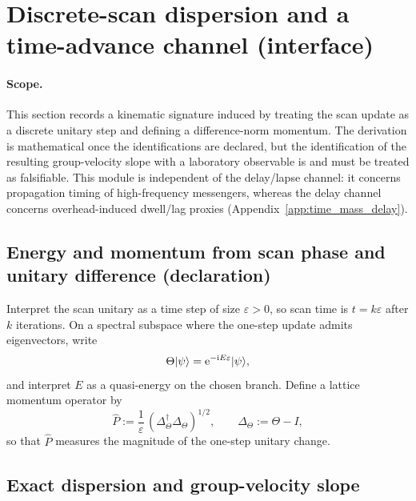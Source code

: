 \section{Discrete-scan dispersion and a time-advance channel (interface)}
\label{sec:dispersion_time_advance}

\paragraph{Scope.}
\AuditTag This section records a kinematic signature induced by treating the scan update as a discrete unitary step and defining a difference-norm momentum.
The derivation is mathematical once the identifications are declared, but the identification of the resulting group-velocity slope with a laboratory observable is \InterfaceTag and must be treated as falsifiable.
This module is independent of the delay/lapse channel: it concerns propagation timing of high-frequency messengers, whereas the delay channel concerns overhead-induced dwell/lag proxies (Appendix~\ref{app:time_mass_delay}).

\subsection{Energy and momentum from scan phase and unitary difference (declaration)}
\label{subsec:dispersion_energy_momentum_decl}

\begin{assumption}
\label{ass:dispersion_energy_momentum_from_scan}
\InterfaceTag Interpret the scan unitary as a time step of size $\varepsilon>0$, so scan time is $t=k\varepsilon$ after $k$ iterations.
On a spectral subspace where the one-step update admits eigenvectors, write
\[
\Theta|\psi\rangle=\mathrm{e}^{-\mathrm{i} E\varepsilon}|\psi\rangle,
\]
and interpret $E$ as a quasi-energy on the chosen branch.
Define a lattice momentum operator by
\[
\widehat{P}:=\frac{1}{\varepsilon}\,(\Delta_\Theta^\dagger\Delta_\Theta)^{1/2},
\qquad
\Delta_\Theta:=\Theta-I,
\]
so that $\widehat{P}$ measures the magnitude of the one-step unitary change.
\end{assumption}

\subsection{Exact dispersion and group-velocity slope}
\label{subsec:dispersion_exact_and_group_velocity}

